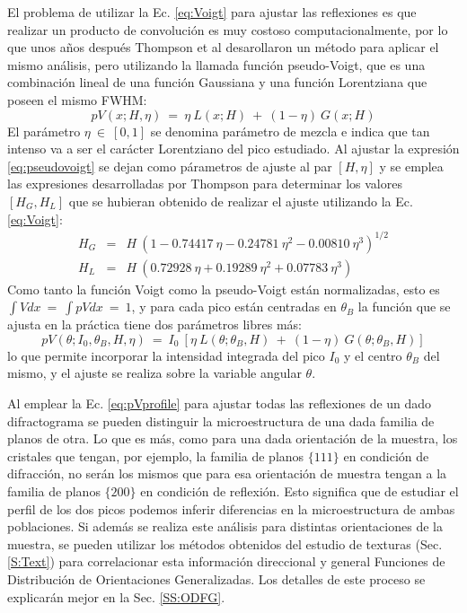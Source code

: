 El problema de utilizar la Ec. \ref{eq:Voigt} para ajustar las reflexiones es que realizar un producto de convolución es muy costoso computacionalmente, por lo que unos años después Thompson et al\cite{Thompson1987} desarollaron un método para aplicar el mismo análisis, pero utilizando la llamada función pseudo-Voigt, que es una combinación lineal de una función Gaussiana y una función Lorentziana que poseen el mismo FWHM:
\begin{equation}
  pV(x; H, \eta) \ = \ \eta \ L(x; H) \ + \ (1 - \eta) \ G(x; H)
  \label{eq:pseudovoigt}
\end{equation}
\noindent
El parámetro $\eta \ \in \ [0,1]$ se denomina parámetro de mezcla e indica que tan intenso va a ser el carácter Lorentziano del pico estudiado. 
Al ajustar la expresión \ref{eq:pseudovoigt} se dejan como párametros de ajuste al par $[H, \eta]$ y se emplea las expresiones desarrolladas por Thompson para determinar los valores $[H_G, H_L]$ que se hubieran obtenido de realizar el ajuste utilizando la Ec. \ref{eq:Voigt}:
\begin{eqnarray}
  H_G & = & H \ (1 -  0.74417 \ \eta - 0.24781 \ \eta^2 - 0.00810 \ \eta^3)^{1/2} \\
  H_L & = & H \ (0.72928 \ \eta + 0.19289 \ \eta^2 + 0.07783 \ \eta^3)
  \label{eq:Hg}
\end{eqnarray}
\noindent
Como tanto la función Voigt como la pseudo-Voigt están normalizadas, esto es $\int V dx \ = \ \int pV dx \ = \ 1$, y para cada pico están centradas en $\theta_B$ la función que se ajusta en la práctica tiene dos parámetros libres más:
\begin{equation}
    pV(\theta; I_0, \theta_B, H, \eta) \ = \ I_0 \ [\eta \ L(\theta; \theta_B, H) \ + \ (1 - \eta) \ G(\theta; \theta_B, H)]
  \label{eq:pVprofile}
\end{equation}
\noindent
lo que permite incorporar la intensidad integrada del pico $I_0$ y el centro $\theta_B$ del mismo, y el ajuste se realiza sobre la variable angular $\theta$.

Al emplear la Ec. \ref{eq:pVprofile} para ajustar todas las reflexiones de un dado difractograma se pueden distinguir la microestructura de una dada familia de planos de otra.
Lo que es más, como para una dada orientación de la muestra, los cristales que tengan, por ejemplo, la familia de planos $\{111\}$ en condición de difracción, no serán los mismos que para esa orientación de muestra tengan a la familia de planos $\{200\}$ en condición de reflexión.
Esto significa que de estudiar el perfil de los dos picos podemos inferir diferencias en la microestructura de ambas poblaciones.
Si además se realiza este análisis para distintas orientaciones de la muestra, se pueden utilizar los métodos obtenidos del estudio de texturas (Sec. \ref{S:Text}) para correlacionar esta información direccional y general Funciones de Distribución de Orientaciones Generalizadas.
Los detalles de este proceso se explicarán mejor en la Sec. \ref{SS:ODFG}.

